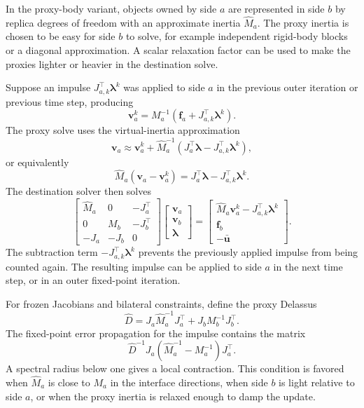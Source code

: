 \documentclass[11pt]{article}
\newcommand{\va}{\bm v_a}
\newcommand{\vb}{\bm v_b}
\newcommand{\ubar}{\bar{\bm u}}
\newcommand{\fa}{\bm f_a}
\newcommand{\fb}{\bm f_b}
\newcommand{\lam}{\bm\lambda}
\newcommand{\Ja}{J_a}
\newcommand{\Jb}{J_b}
\newcommand{\Ma}{M_a}
\newcommand{\Mb}{M_b}
\newcommand{\Mhat}{\widehat M_a}
\newcommand{\Dhat}{\widehat D}
\begin{document}
In the proxy-body variant, objects owned by side $a$ are represented in side $b$ by
replica degrees of freedom with an approximate inertia $\Mhat$. The proxy inertia is
chosen to be easy for side $b$ to solve, for example independent rigid-body blocks or a
diagonal approximation. A scalar relaxation factor can be used to make the proxies
lighter or heavier in the destination solve.

Suppose an impulse $J_{a,k}^\top\lam^k$ was applied to side $a$ in the previous outer
iteration or previous time step, producing
\begin{equation}
    \va^k = \Ma^{-1}\left(\fa + J_{a,k}^\top\lam^k\right).
    \label{eq:lagged-va}
\end{equation}
The proxy solve uses the virtual-inertia approximation
\begin{equation}
    \va
    \approx
    \va^k
    + \Mhat^{-1}\left(\Ja^\top\lam - J_{a,k}^\top\lam^k\right),
    \label{eq:virtual-inertia-update}
\end{equation}
or equivalently
\begin{equation}
    \Mhat(\va-\va^k)=\Ja^\top\lam-J_{a,k}^\top\lam^k.
    \label{eq:virtual-inertia-increment}
\end{equation}
The destination solver then solves
\begin{equation}
\begin{bmatrix}
\Mhat & 0 & -\Ja^\top \\
0 & \Mb & -\Jb^\top \\
-\Ja & -\Jb & 0
\end{bmatrix}
\begin{bmatrix}
\va \\ \vb \\ \lam
\end{bmatrix}
=
\begin{bmatrix}
\Mhat\va^k - J_{a,k}^\top\lam^k \\
\fb \\
-\ubar
\end{bmatrix}.
\label{eq:proxy-kkt}
\end{equation}
The subtraction term $-J_{a,k}^\top\lam^k$ prevents the previously applied impulse from
being counted again. The resulting impulse can be applied to side $a$ in the next time
step, or in an outer fixed-point iteration.

For frozen Jacobians and bilateral constraints, define the proxy Delassus
\[
    \Dhat = \Ja\Mhat^{-1}\Ja^\top + \Jb\Mb^{-1}\Jb^\top .
\]
The fixed-point error propagation for the impulse contains the matrix
\begin{equation}
    \Dhat^{-1}\Ja\left(\Mhat^{-1}-\Ma^{-1}\right)\Ja^\top .
    \label{eq:proxy-convergence}
\end{equation}
A spectral radius below one gives a local contraction. This condition is favored when
$\Mhat$ is close to $\Ma$ in the interface directions, when side $b$ is light relative
to side $a$, or when the proxy inertia is relaxed enough to damp the update.
\end{document}
